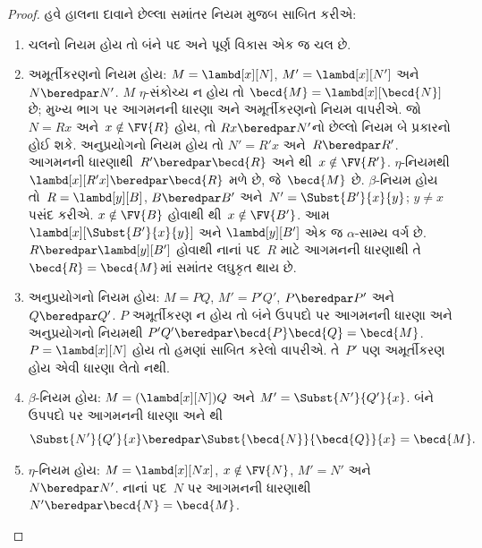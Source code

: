 \begin{proof}
  હવે હાલના દાવાને છેલ્લા સમાંતર નિયમ મુજબ સાબિત કરીએ:
  \begin{enumerate}
  \item ચલનો નિયમ હોય તો બંને પદ અને પૂર્ણ વિકાસ એક જ ચલ છે.
  \item અમૂર્તીકરણનો નિયમ હોય:
    $M=\lambd[x][N]$, $M'=\lambd[x][N']$ અને
    $N\beredpar N'$.
    $M$ $\eta$-સંકોચ્ય ન હોય તો
    $\becd{M}=\lambd[x][\becd{N}]$ છે;
    મુખ્ય ભાગ પર આગમનની ધારણા અને અમૂર્તીકરણનો નિયમ વાપરીએ.
    જો~$N=Rx$ અને~$x\notin\FV{R}$ હોય, તો
    $Rx\beredpar N'$નો છેલ્લો નિયમ બે પ્રકારનો હોઈ શકે.
    અનુપ્રયોગનો નિયમ હોય તો
    $N'=R'x$ અને~$R\beredpar R'$.
    આગમનની ધારણાથી~$R'\beredpar\becd{R}$ અને
    થી~$x\notin\FV{R'}$.
    $\eta$-નિયમથી~$\lambd[x][R'x]\beredpar\becd{R}$
    મળે છે, જે~$\becd{M}$ છે.
    $\beta$-નિયમ હોય તો~$R=\lambd[y][B]$,
    $B\beredpar B'$ અને~$N'=\Subst{B'}{x}{y}$;
    $y\neq x$ પસંદ કરીએ.
    $x\notin\FV{B}$ હોવાથી
    થી~$x\notin\FV{B'}$.
    આમ~$\lambd[x][\Subst{B'}{x}{y}]$ અને
    $\lambd[y][B']$ એક જ $\alpha$-સામ્ય વર્ગ છે.
    $R\beredpar\lambd[y][B']$ હોવાથી નાનાં પદ~$R$
    માટે આગમનની ધારણાથી તે~$\becd{R}=\becd{M}$માં
    સમાંતર લઘુકૃત થાય છે.
  \item અનુપ્રયોગનો નિયમ હોય:
    $M=PQ$, $M'=P'Q'$, $P\beredpar P'$ અને
    $Q\beredpar Q'$.
    $P$ અમૂર્તીકરણ ન હોય તો બંને ઉપપદો પર આગમનની
    ધારણા અને અનુપ્રયોગનો નિયમથી
    $P'Q'\beredpar\becd{P}\becd{Q}=\becd{M}$.
    $P=\lambd[x][N]$ હોય તો હમણાં સાબિત કરેલો
     વાપરીએ.
    તે~$P'$ પણ અમૂર્તીકરણ હોય એવી ધારણા લેતો નથી.
  \item $\beta$-નિયમ હોય:
    $M=(\lambd[x][N])Q$ અને
    $M'=\Subst{N'}{Q'}{x}$.
    બંને ઉપપદો પર આગમનની ધારણા અને
    થી
    \[
    \Subst{N'}{Q'}{x}\beredpar
    \Subst{\becd{N}}{\becd{Q}}{x}=\becd{M}.
    \]
  \item $\eta$-નિયમ હોય:
    $M=\lambd[x][Nx]$, $x\notin\FV{N}$,
    $M'=N'$ અને~$N\beredpar N'$.
    નાનાં પદ~$N$ પર આગમનની ધારણાથી
    $N'\beredpar\becd{N}=\becd{M}$.
  \end{enumerate}
\end{proof}


